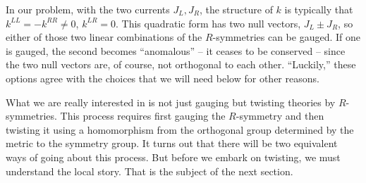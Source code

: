 In our problem, with the two currents $J_L,J_R$, the structure of $k$
is typically that $k^{LL}=-k^{RR}\not= 0$, $k^{LR}=0$.  This quadratic
form has two null vectors, $J_L\pm J_R$, so either of those two
linear combinations of the $R$-symmetries can be gauged.  If one
is gauged, the second becomes ``anomalous'' -- it ceases to be conserved --
since the two null vectors are, of course, not orthogonal to each other.
``Luckily,'' these options agree with the choices that we will need
below for other reasons.

What we are really interested in is not just gauging but
twisting theories by
$R$-symmetries.
This process requires first gauging the $R$-symmetry and then twisting
it using a homomorphism from the orthogonal group determined by the
metric  to the symmetry group. It turns out that there will be two
equivalent ways of going about this process.
But before we embark on twisting, we must understand the local
story.
That is the subject of the next section.


